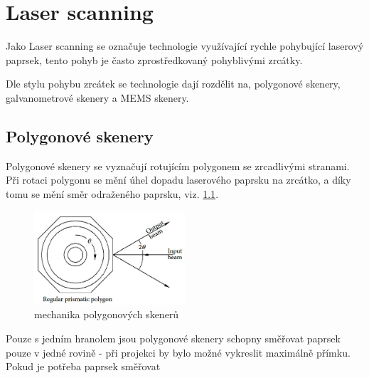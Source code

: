 \chapter{Laser scanning~\cite{scanning-handbook}}

Jako Laser scanning se označuje technologie využívající rychle pohybující laserový paprsek, tento pohyb je často zprostředkovaný pohyblivými zrcátky.

Dle stylu pohybu zrcátek se technologie dají rozdělit na, polygonové skenery, galvanometrové skenery a MEMS skenery.

\section{Polygonové skenery}
Polygonové skenery se vyznačují rotujícím polygonem se zrcadlivými stranami. Při rotaci polygonu se mění úhel dopadu laserového paprsku na zrcátko, a díky tomu se mění směr odraženého paprsku, viz. \ref{fig:polygon-scanner}.

\begin{figure}[!htb]
  \centering
  \includegraphics[width=0.5\textwidth]{img/polygon-scanner.jpg}
  \caption{\label{fig:polygon-scanner} mechanika polygonových skenerů}
\end{figure}


%

Pouze s jedním hranolem jsou polygonové skenery schopny směřovat paprsek pouze v jedné rovině - při projekci by bylo možné vykreslit maximálně přímku. Pokud je potřeba paprsek směřovat 

